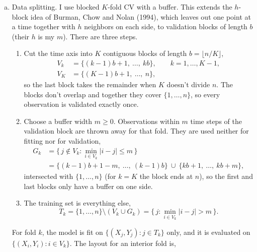 \documentclass[12pt,letterpaper, onecolumn]{exam}
\begin{document}
\begin{questions}
\begin{solution}
\begin{enumerate}[(a)]
            \item Data splitting. I use blocked $K$-fold CV with a buffer. This extends the $h$-block idea of Burman, Chow and Nolan (1994), which leaves out one point at a time together with $h$ neighbors on each side, to validation blocks of length $b$ (their $h$ is my $m$). There are three steps.
            \begin{enumerate}[1.)]
                \item Cut the time axis into $K$ contiguous blocks of length $b = \lfloor n/K\rfloor$,
                \begin{align*}
                    V_k &= \{(k-1)b+1,\ \dots,\ kb\}, \qquad k=1,\dots,K-1,\\
                    V_K &= \{(K-1)b+1,\ \dots,\ n\},
                \end{align*}
                so the last block takes the remainder when $K$ doesn't divide $n$.
                The blocks don't overlap and together they cover $\{1,\dots,n\}$, so every observation is validated exactly once.
                \item Choose a buffer width $m\ge 0$. Observations within $m$ time steps of the validation block are thrown away for that fold. They are used neither for fitting nor for validation,
                \begin{align*}
                    G_k &= \{\,j\notin V_k : \min_{i\in V_k}|i-j| \le m\,\}\\
                    &= \{(k-1)b+1-m,\ \dots,\ (k-1)b\}\ \cup\ \{kb+1,\ \dots,\ kb+m\},
                \end{align*}
                intersected with $\{1,\dots,n\}$ (for $k=K$ the block ends at $n$), so the first and last blocks only have a buffer on one side.
                \item The training set is everything else,
                \begin{equation*}
                    T_k = \{1,\dots,n\}\setminus (V_k\cup G_k) = \{\,j : \min_{i\in V_k}|i-j| > m\,\}.
                \end{equation*}
            \end{enumerate}
            For fold $k$, the model is fit on $\{(X_j,Y_j): j\in T_k\}$ only, and it is evaluated on $\{(X_i,Y_i): i\in V_k\}$. The layout for an interior fold is,
            \begin{center}
\end{center}
\end{enumerate}
\end{solution}
\end{questions}
\end{document}
